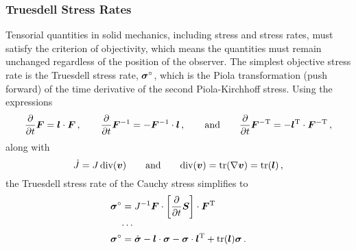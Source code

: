 \documentclass[10pt,letterpaper,oneside]{report}
\newcommand{\ten}[1]{\mbox{\boldmath $#1$}{}}
\newcommand{\scas}[1]{\mbox{{\scriptsize{${\rm{#1}}$}}}{}}
\begin{document}
\subsubsection{Truesdell Stress Rates}
Tensorial quantities in solid mechanics, including stress and stress rates, must satisfy the criterion of objectivity, which means the quantities must remain unchanged regardless of the position of the observer.  The simplest objective stress rate is the Truesdell stress rate, $\ten{\sigma}^{\circ}$, which is the Piola transformation (push forward) of the time derivative of the second Piola-Kirchhoff stress.  Using the expressions 
\begin{equation}
\frac{\partial }{\partial t} \ten{F} = \ten{l} \cdot \ten{F} \, , 
\qquad  
\frac{\partial }{\partial t} \ten{F}^{-1} = - \ten{F}^{-1} \cdot \ten{l} \, , 
\qquad \mbox{and} \qquad
\frac{\partial }{\partial t} \ten{F}^{-\scas{T}} = - \ten{l}^{\scas{T}} \cdot \ten{F}^{-\scas{T}} \, , 
\end{equation}
along with
\begin{equation}
\dot{J} = J \, \mbox{div} (\ten{v}) 
\qquad \mbox{and} \qquad 
\mbox{div} (\ten{v}) = \mbox{tr} (\nabla \ten{v} ) = \mbox{tr} (\ten{l}) \, , 
\end{equation}
the Truesdell stress rate of the Cauchy stress simplifies to
\begin{align}
\ten{\sigma}^{\circ } ={}& J^{-1} \ten{F} \cdot \left[ \frac{\partial }{\partial t} \ten{S} \right] \cdot \ten{F}^{\scas{T}}
\\
\cdots{}& \notag \\
\ten{\sigma}^{\circ } 
={}& \dot{\ten{\sigma}} -  \ten{l} \cdot  \ten{\sigma} -  \ten{\sigma} \cdot \ten{l}^{\scas{T}} + \mbox{tr} (\ten{l}) \ten{\sigma} \, .
\end{align}
\end{document}

